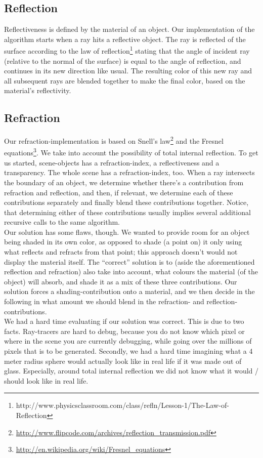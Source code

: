 \subsection{Reflection}
Reflectiveness is defined by the material of an object. Our implementation of the algorithm starts when a ray hits a reflective object. The ray is reflected of the surface according to the law of reflection\footnote{http://www.physicsclassroom.com/class/refln/Lesson-1/The-Law-of-Reflection} stating that the angle of incident ray (relative to the normal of the surface) is equal to the angle of reflection, and continues in its new direction like usual. The resulting color of this new ray and all subsequent rays are blended together to make the final color, based on the material’s reflectivity.

\subsection{Refraction}
Our refraction-implementation is based on Snell’s law\footnote{\url{http://www.flipcode.com/archives/reflection_transmission.pdf}} and the Fresnel equations\footnote{\url{http://en.wikipedia.org/wiki/Fresnel_equations}}. We take into account the possibility of total internal reflection. To get us started, scene-objects has a refraction-index, a reflectiveness and a transparency. The whole scene has a refraction-index, too. When a ray intersects the boundary of an object, we determine whether there’s a contribution from refraction and reflection, and then, if relevant, we determine each of these contributions separately and finally blend these contributions together. Notice, that determining either of these contributions usually implies several additional recursive calls to the same algorithm. \\

Our solution has some flaws, though. We wanted to provide room for an object being shaded in its own color, as opposed to shade (a point on) it only using what reflects and refracts from that point; this approach doesn’t would not display the material itself. The “correct” solution is to (aside the aforementioned reflection and refraction) also take into account, what colours the material (of the object) will absorb, and shade it as a mix of these three contributions. Our solution forces a shading-contribution onto a material, and we then decide in the following in what amount we should blend in the refraction- and reflection-contributions.  \\

We had a hard time evaluating if our solution was correct. This is due to two facts. Ray-tracers are hard to debug, because you do not know which pixel or where in the scene you are currently debugging, while going over the millions of pixels that is to be generated. Secondly, we had a hard time imagining what a 4 meter radius sphere would actually look like in real life if it was made out of glass. Especially, around total internal reflection we did not know what it would / should look like in real life.